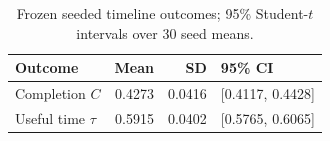 \begin{table}[t]
\centering
\caption{Frozen seeded timeline outcomes; 95\% Student-$t$ intervals over 30 seed means.}
\label{tab:primary}
\small
\begin{tabular}{lrrl}
\toprule
Outcome & Mean & SD & 95\% CI \\
\midrule
Completion $C$ & 0.4273 & 0.0416 & [0.4117, 0.4428] \\
Useful time $\tau$ & 0.5915 & 0.0402 & [0.5765, 0.6065] \\
\bottomrule
\end{tabular}
\end{table}
